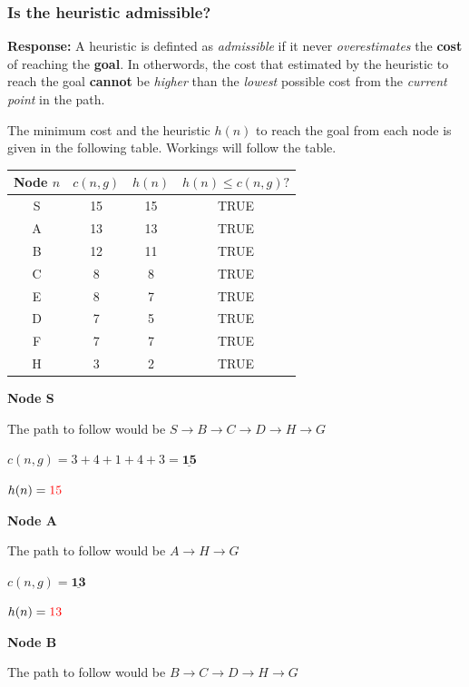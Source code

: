 \documentclass[12pt, letterpaper]{article}
\begin{document}
\subsubsection{Is the heuristic admissible?}

\textbf{Response:} A heuristic is definted as \textit{admissible} if it never \textit{overestimates} the \textbf{cost} of reaching the \textbf{goal}. 
In otherwords, the cost that estimated by the heuristic to reach the goal \textbf{cannot} be \textit{higher} than the \textit{lowest} possible cost from the \textit{current point} in the path.

The minimum cost and the heuristic $h(n)$ to reach the goal from each node is given in the following table.
Workings will follow the table.

\begin{center}
    \begin{tabular}{|c|c|c|c|} 
    \hline
    Node $n$ & $c(n,g)$ & $h(n)$ & $h(n)\leq c(n,g)?$ \\ 
    \hline
    S & 15 & 15 & TRUE\\
    \hline
    A & 13 & 13 & TRUE\\
    \hline
    B & 12 & 11 & TRUE\\
    \hline
    C & 8 & 8 & TRUE\\
    \hline
    E & 8 & 7 & TRUE\\
    \hline
    D & 7 & 5 & TRUE\\
    \hline
    F & 7 & 7 & TRUE\\
    \hline
    H & 3 & 2 & TRUE\\
    \hline
    \end{tabular}
\end{center}

\textbf{Node S}

The path to follow would be $S\rightarrow B\rightarrow C\rightarrow D\rightarrow H\rightarrow G$

$c(n,g)=3+4+1+4+3=\underline{\textbf{15}}$

$h(n)=\textcolor{red}{15}$

\textbf{Node A}

The path to follow would be $A\rightarrow H\rightarrow G$

$c(n,g)=\underline{\textbf{13}}$

$h(n)=\textcolor{red}{13}$

\textbf{Node B}

The path to follow would be $B\rightarrow C\rightarrow D\rightarrow H\rightarrow G$
\end{document}
